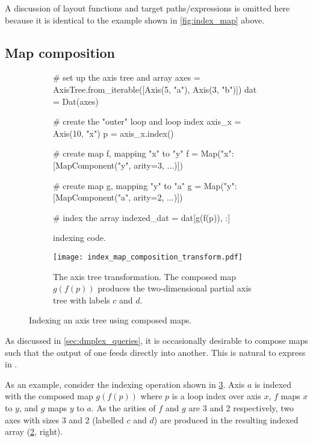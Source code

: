 \documentclass[thesis]{subfiles}
\begin{document}
A discussion of layout functions and target paths/expressions is omitted here because it is identical to the example shown in \cref{fig:index_map} above.

\subsection{Map composition}
\label{sec:indexing_map_composition}

\begin{figure}
  \centering

  \begin{subfigure}{.9\textwidth}
    \begin{pyalg2}
      # set up the axis tree and array
      axes = AxisTree.from_iterable([Axis(5, "a"), Axis(3, "b")])
      dat = Dat(axes)

      # create the "outer" loop and loop index
      axis_x = Axis(10, "x")
      p = axis_x.index()

      # create map f, mapping "x" to "y"
      f = Map({"x": [MapComponent("y", arity=3, ...)]})

      # create map g, mapping "y" to "a"
      g = Map({"y": [MapComponent("a", arity=2, ...)]})

      # index the array
      indexed_dat = dat[g(f(p)), :]
    \end{pyalg2}

    \caption{ indexing code.}
    \label{fig:index_map_composition_code}
  \end{subfigure}

  \vspace{1em}

  \begin{subfigure}{\textwidth}
    \centering
    \texttt{[image: index\_map\_composition\_transform.pdf]}
    \caption{
      The axis tree transformation.
      The composed map $g(f(p))$ produces the two-dimensional partial axis tree with labels $c$ and $d$.
    }
    \label{fig:index_map_composition_transform}
  \end{subfigure}
  \caption{Indexing an axis tree using composed maps.}
  \label{fig:index_map_composition}
\end{figure}

As discussed in \cref{sec:dmplex_queries}, it is occasionally desirable to compose maps such that the output of one feeds directly into another.
This is natural to express in .

As an example, consider the indexing operation shown in \cref{fig:index_map_composition}.
Axis $a$ is indexed with the composed map $g(f(p))$ where $p$ is a loop index over axis $x$, $f$ maps $x$ to $y$, and $g$ maps $y$ to $a$.
As the arities of $f$ and $g$ are 3 and 2 respectively, two axes with sizes 3 and 2 (labelled $c$ and $d$) are produced in the resulting indexed array (\ref{fig:index_map_composition_transform}, right).
\end{document}
